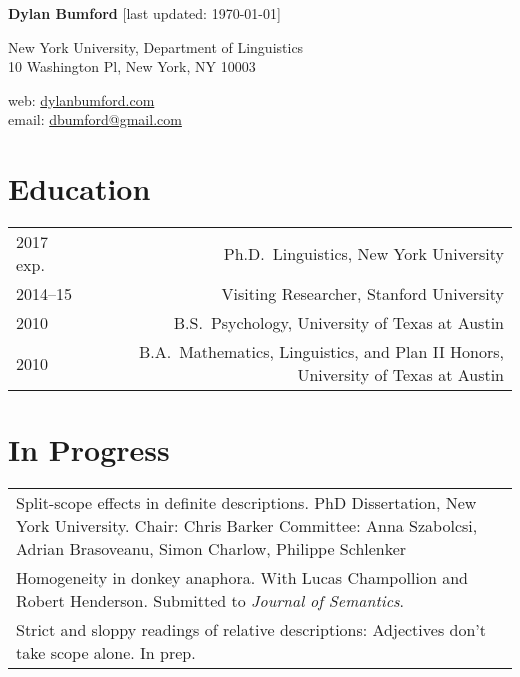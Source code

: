 \documentclass[12pt]{article}
\renewcommand{\arraystretch}{1.5} %
\begin{document}
\textbf{Dylan Bumford}\hfill
{\color{gray}[last updated: \today]}

\bigskip

\begin{minipage}[t]{0.55\textwidth}
New York University, Department of Linguistics\\
10 Washington Pl, New York, NY 10003
\end{minipage}
\begin{minipage}[t]{\linegoal}
\raggedleft%
web: \url{dylanbumford.com}\\
email: \href{mailto:dbumford@gmail.com}{dbumford@gmail.com}
\end{minipage}

\bigskip

\section*{Education}

\begingroup
\renewcommand{\arraystretch}{1} %
\begin{longtable}{LR}
  2017 exp.   & Ph.D.~Linguistics, New York University\\
  2014--15    & Visiting Researcher, Stanford University\\
  2010        & B.S.~Psychology, University of Texas at Austin\\
  2010        & B.A.~Mathematics, Linguistics, and Plan II Honors, University of
                Texas at Austin
\end{longtable}
\endgroup

\medskip

\section*{In Progress}

\begin{longtable}{@{}p{\textwidth}@{}}
  Split-scope effects in definite descriptions. PhD Dissertation, New York
  University.\newline
  Chair: Chris Barker\newline
  Committee: Anna Szabolcsi, Adrian Brasoveanu, Simon Charlow, Philippe
  Schlenker\\
  Homogeneity in donkey anaphora. With Lucas Champollion and Robert
  Henderson. Submitted to \textit{Journal of Semantics}.\\
  Strict and sloppy readings of relative descriptions: Adjectives don't take
  scope alone. In prep.
\end{longtable}
\end{document}
